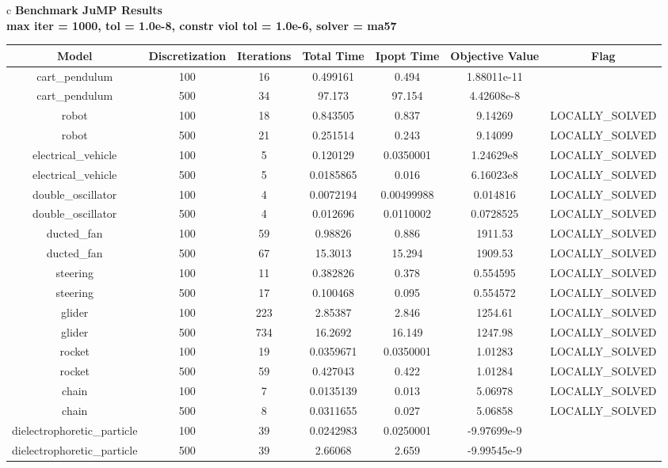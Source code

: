 \documentclass{standalone}
\begin{document}
\begin{tabular}{c}
\hline
\Large\textbf{Benchmark JuMP Results}\\
\large\textbf{max iter = 1000, tol = 1.0e-8, constr viol tol = 1.0e-6, solver = ma57}\\
\begin{tabular}{ccccccc}
  \hline
  \textbf{Model} & \textbf{Discretization} & \textbf{Iterations} & \textbf{Total Time} & \textbf{Ipopt Time} & \textbf{Objective Value} & \textbf{Flag} \\\hline
  cart\_pendulum & 100 & 16 & 0.499161 & 0.494 & 1.88011e-11 & \color{red}{LOCALLY\_INFEASIBLE} \\
  cart\_pendulum & 500 & 34 & 97.173 & 97.154 & 4.42608e-8 & \color{red}{LOCALLY\_INFEASIBLE} \\
  robot & 100 & 18 & 0.843505 & 0.837 & 9.14269 & LOCALLY\_SOLVED \\
  robot & 500 & 21 & 0.251514 & 0.243 & 9.14099 & LOCALLY\_SOLVED \\
  electrical\_vehicle & 100 & 5 & 0.120129 & 0.0350001 & 1.24629e8 & LOCALLY\_SOLVED \\
  electrical\_vehicle & 500 & 5 & 0.0185865 & 0.016 & 6.16023e8 & LOCALLY\_SOLVED \\
  double\_oscillator & 100 & 4 & 0.0072194 & 0.00499988 & 0.014816 & LOCALLY\_SOLVED \\
  double\_oscillator & 500 & 4 & 0.012696 & 0.0110002 & 0.0728525 & LOCALLY\_SOLVED \\
  ducted\_fan & 100 & 59 & 0.98826 & 0.886 & 1911.53 & LOCALLY\_SOLVED \\
  ducted\_fan & 500 & 67 & 15.3013 & 15.294 & 1909.53 & LOCALLY\_SOLVED \\
  steering & 100 & 11 & 0.382826 & 0.378 & 0.554595 & LOCALLY\_SOLVED \\
  steering & 500 & 17 & 0.100468 & 0.095 & 0.554572 & LOCALLY\_SOLVED \\
  glider & 100 & 223 & 2.85387 & 2.846 & 1254.61 & LOCALLY\_SOLVED \\
  glider & 500 & 734 & 16.2692 & 16.149 & 1247.98 & LOCALLY\_SOLVED \\
  rocket & 100 & 19 & 0.0359671 & 0.0350001 & 1.01283 & LOCALLY\_SOLVED \\
  rocket & 500 & 59 & 0.427043 & 0.422 & 1.01284 & LOCALLY\_SOLVED \\
  chain & 100 & 7 & 0.0135139 & 0.013 & 5.06978 & LOCALLY\_SOLVED \\
  chain & 500 & 8 & 0.0311655 & 0.027 & 5.06858 & LOCALLY\_SOLVED \\
  dielectrophoretic\_particle & 100 & 39 & 0.0242983 & 0.0250001 & -9.97699e-9 & \color{red}{LOCALLY\_INFEASIBLE} \\
  dielectrophoretic\_particle & 500 & 39 & 2.66068 & 2.659 & -9.99545e-9 & \color{red}{LOCALLY\_INFEASIBLE} \\\hline
\end{tabular}
\end{tabular}
\end{document}
